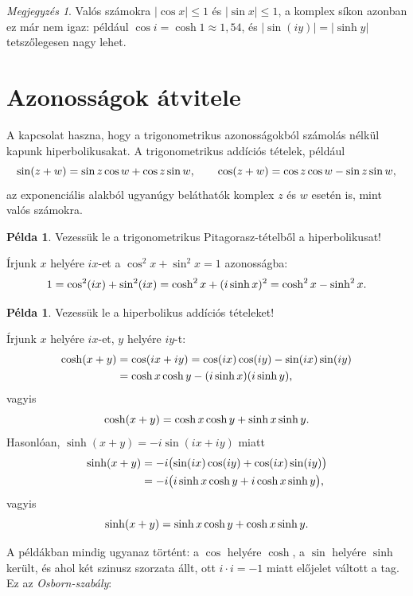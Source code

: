 \documentclass[11pt]{scrartcl}
\theoremstyle{definition}
\newtheorem{example}[definition]{Példa}
\theoremstyle{remark}
\newtheorem*{remark}{Megjegyzés}
\begin{document}
\begin{remark}
	Valós számokra $|\cos x| \le 1$ és $|\sin x| \le 1$, a komplex síkon
	azonban ez már nem igaz: például $\cos i = \cosh 1 \approx 1{,}54$, és
	$|\sin(iy)| = |\sinh y|$ tetszőlegesen nagy lehet.
\end{remark}

\section{Azonosságok átvitele}

A kapcsolat haszna, hogy a trigonometrikus azonosságokból számolás nélkül
kapunk hiperbolikusakat. A trigonometrikus addíciós tételek, például
\[
	\sin(z + w) = \sin z \cos w + \cos z \sin w, \qquad
	\cos(z + w) = \cos z \cos w - \sin z \sin w\text,
\]
az exponenciális alakból ugyanúgy beláthatók komplex $z$ és $w$ esetén is,
mint valós számokra.

\begin{example}
	Vezessük le a trigonometrikus Pitagorasz-tételből a hiperbolikusat!

	Írjunk $x$ helyére $ix$-et a $\cos^2 x + \sin^2 x = 1$ azonosságba:
	\[
		1 = \cos^2(ix) + \sin^2(ix)
		= \cosh^2 x + (i \sinh x)^2
		= \cosh^2 x - \sinh^2 x\text.
	\]
\end{example}

\begin{example}
	Vezessük le a hiperbolikus addíciós tételeket!

	Írjunk $x$ helyére $ix$-et, $y$ helyére $iy$-t:
	\[
		\begin{aligned}
			\cosh(x + y) & = \cos(ix + iy)
			= \cos(ix) \cos(iy) - \sin(ix) \sin(iy)                         \\
			             & = \cosh x \cosh y - (i \sinh x)(i \sinh y)\text,
		\end{aligned}
	\]
	vagyis
	\[
		\cosh(x + y) = \cosh x \cosh y + \sinh x \sinh y\text.
	\]
	Hasonlóan, $\sinh(x + y) = -i \sin(ix + iy)$ miatt
	\[
		\begin{aligned}
			\sinh(x + y) & = -i \bigl(\sin(ix) \cos(iy) + \cos(ix) \sin(iy)\bigr)       \\
			             & = -i \bigl(i \sinh x \cosh y + i \cosh x \sinh y\bigr)\text,
		\end{aligned}
	\]
	vagyis
	\[
		\sinh(x + y) = \sinh x \cosh y + \cosh x \sinh y\text.
	\]
\end{example}

A példákban mindig ugyanaz történt: a $\cos$ helyére $\cosh$, a $\sin$ helyére
$\sinh$ került, és ahol két szinusz szorzata állt, ott $i \cdot i = -1$ miatt
előjelet váltott a tag. Ez az \emph{Osborn-szabály}:
\end{document}
